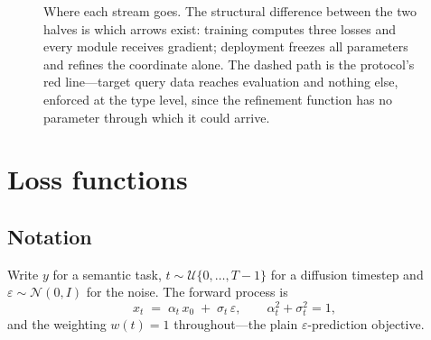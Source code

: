 \documentclass[11pt]{article}
\newcommand{\zS}{z_{S}}
\newcommand{\ztilT}{\tilde{z}_{T}}
\newcommand{\zstarT}{z^{\star}_{T}}
\newcommand{\Dss}{D^{s}_{y,S}}
\newcommand{\Dst}{D^{s}_{y,T}}
\newcommand{\Dqt}{D^{q}_{y,T}}
\begin{document}
\begin{figure}[htbp]
{}

\caption{Where each stream goes. The structural difference between the two halves is which arrows
exist: training computes three losses and every module receives gradient; deployment freezes all
parameters and refines the coordinate alone. The dashed path is the protocol's red line---target
query data reaches evaluation and nothing else, enforced at the type level, since the refinement
function has no parameter through which it could arrive.}
\label{fig:flow}
\end{figure}

\section{Loss functions}
\label{sec:loss-u}

\subsection{Notation}

Write $y$ for a semantic task, $t\sim\mathcal{U}\{0,\dots,T-1\}$ for a diffusion timestep and
$\varepsilon\sim\mathcal{N}(0,I)$ for the noise. The forward process is
\begin{equation}
x_t \;=\; \alpha_t\,x_0 \;+\; \sigma_t\,\varepsilon,
\qquad \alpha_t^{2}+\sigma_t^{2}=1,
\end{equation}
and the weighting $w(t)=1$ throughout---the plain $\varepsilon$-prediction objective.
\end{document}

